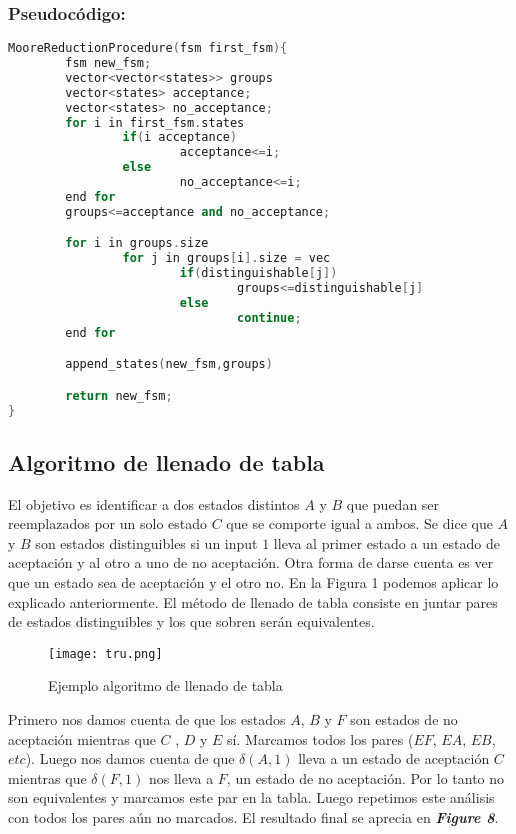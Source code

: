 \documentclass[12pt]{article}
\begin{document}
\subsubsection{Pseudoc\'odigo:}
\begin{lstlisting}[language=c++]
MooreReductionProcedure(fsm first_fsm){
        fsm new_fsm;
        vector<vector<states>> groups
        vector<states> acceptance;
        vector<states> no_acceptance;
        for i in first_fsm.states
                if(i acceptance)
                        acceptance<=i;
                else
                        no_acceptance<=i;
        end for
        groups<=acceptance and no_acceptance;

        for i in groups.size
                for j in groups[i].size = vec
                        if(distinguishable[j])
                                groups<=distinguishable[j]
                        else
                                continue;
        end for

        append_states(new_fsm,groups)

        return new_fsm;
}

\end{lstlisting}


\subsection{Algoritmo de llenado de tabla}

	El objetivo es identificar a dos estados distintos $A$ y $B$ que puedan ser reemplazados por un solo estado $C$ que se comporte igual a ambos. Se dice que $A$ y $B$ son estados distinguibles si un input $1$ lleva al primer estado a un estado de aceptación y al otro a uno de no aceptación. Otra forma de darse cuenta es ver que un estado sea de aceptación y el otro no.	En la Figura 1 podemos aplicar lo explicado anteriormente. El método de llenado de tabla consiste en juntar pares de estados distinguibles y los que sobren serán equivalentes.


\begin{figure}[h]
    \centering
    \texttt{[image: tru.png]}
    \caption{Ejemplo algoritmo de llenado de tabla}
    \label{fig:my_label}
\end{figure}

Primero nos damos cuenta de que los estados $A$, $B$ y $F$ son estados de no aceptación mientras que $C$ , $D$ y $E$ sí. Marcamos todos los pares ($EF$, $EA$, $EB$, $etc$). Luego nos damos cuenta de que $δ(A,1)$ lleva a un estado de aceptación $C$ mientras que $δ(F,1)$ nos lleva a $F$, un estado de no aceptación. Por lo tanto no son equivalentes y marcamos este par en la tabla. Luego repetimos este análisis con todos los pares aún no marcados. El resultado final se aprecia  en \textbf{\textit{Figure 8}}.
\end{document}
